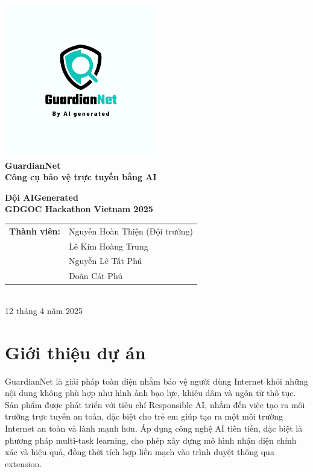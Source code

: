 \documentclass[12pt,a4paper]{article}
\begin{document}
\begin{titlepage}
\centering
\includegraphics[width=0.5\textwidth]{./Images/guardiannet-logo.png}\\[1cm]
{\Huge\bfseries GuardianNet\\[0.5cm]}
{\large\bfseries Công cụ bảo vệ trực tuyến bằng AI\\[2cm]}

{\large\textbf{Đội AIGenerated}\\[0.5cm]}
{\large\textbf{GDGOC Hackathon Vietnam 2025}\\[2cm]}

\begin{tabular}{rl}
\textbf{Thành viên:} & Nguyễn Hoàn Thiện (Đội trưởng) \\
& Lê Kim Hoàng Trung \\
& Nguyễn Lê Tất Phú \\
& Doãn Cát Phú
\end{tabular}\\[2cm]

\vfill
{\large 12 tháng 4 năm 2025}
\end{titlepage}

\tableofcontents
\newpage

\section{Giới thiệu dự án}

GuardianNet là giải pháp toàn diện nhằm bảo vệ người dùng Internet khỏi những nội dung không phù hợp như hình ảnh bạo lực, khiêu dâm và ngôn từ thô tục. Sản phẩm được phát triển với tiêu chí Responsible AI, nhắm đến việc tạo ra môi trường trực tuyến an toàn, đặc biệt cho trẻ em giúp tạo ra một môi trường Internet an toàn và lành mạnh hơn. Áp dụng công nghệ AI tiên tiến, đặc biệt là phương pháp multi-task learning, cho phép xây dựng mô hình nhận diện chính xác và hiệu quả, đồng thời tích hợp liền mạch vào trình duyệt thông qua extension.
\end{document}
